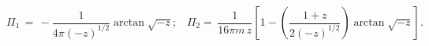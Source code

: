 \begin{equation}
\Pi _{1} \,=\, -\frac{1}{4\pi (-z)^{1/2}}\arctan \sqrt{-z};\, \,\, \,\, \Pi
_{2}=\,\frac{1}{16\pi m\, z}\left[ 1-\left( \frac{1+z}{2 (-z)^{1/2}}\right)\arctan
\sqrt{-z}\right] . \label{p1p2b}
\end{equation}

